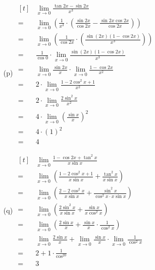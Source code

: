 \documentclass{article}
\begin{document}
\begin{multicols}{2}
\begin{itemize}
\item[(p)] 
$\begin{aligned}[t]
	&\lim\limits_{x\to0}\frac{\tan2x-\sin2x}{x^3} \\
	=&\lim\limits_{x\to0}\left(\frac{1}{x^3}\cdot\left(\frac{\sin2x}{\cos2x}-\frac{\sin2x\cos2x}{\cos2x}\right)\right) \\
	=&\lim\limits_{x\to0}\left(\frac{1}{\cos2x}\cdot\left(\frac{\sin\left(2x\right)\left(1-\cos2x\right)}{x^3}\right)\right) \\
	=&\frac{1}{\cos0}\cdot\lim\limits_{x\to0}\frac{\sin\left(2x\right)\left(1-\cos2x\right)}{x^3} \\
	=&\lim\limits_{x\to0}\frac{\sin2x}{x}\cdot\lim\limits_{x\to0}\frac{1-\cos2x}{x^2} \\
	=&2\cdot\lim\limits_{x\to0}\frac{1-2\cos^2x+1}{x^2} \\
	=&2\cdot\lim\limits_{x\to0}\frac{2\sin^2x}{x^2} \\
	=&4\cdot\lim\limits_{x\to0}\left(\frac{\sin x}{x}\right)^2 \\
	=&4\cdot\left(1\right)^2 \\
	=&\boxed{4}
\end{aligned}$

\item[(q)] 
$\begin{aligned}[t]
	&\lim\limits_{x\to0}\frac{1-\cos2x+\tan^2x}{x\sin x} \\
	=&\lim\limits_{x\to0}\left(\frac{1-2\cos^2x+1}{x\sin x}+\frac{\tan^2x}{x\sin x}\right) \\
	=&\lim\limits_{x\to0}\left(\frac{2-2\cos^2x}{x\sin x}+\frac{\sin^2x}{\cos^2x\cdot x\sin x}\right) \\
	=&\lim\limits_{x\to0}\left(\frac{2\sin^2x}{x\sin x}+\frac{\sin x}{x\cos^2x}\right) \\
	=&\lim\limits_{x\to0}\left(\frac{2\sin x}{x}+\frac{\sin x}{x}\cdot\frac{1}{\cos^2x}\right) \\
	=&\lim\limits_{x\to0}\frac{2\sin x}{x}+\lim\limits_{x\to0}\frac{\sin x}{x}\cdot\lim\limits_{x\to0}\frac{1}{\cos^2x} \\
	=&2+1\cdot\frac{1}{\cos^20} \\
	=&\boxed{3} \\
\end{aligned}$


\end{itemize}
\end{multicols}
\end{document}
